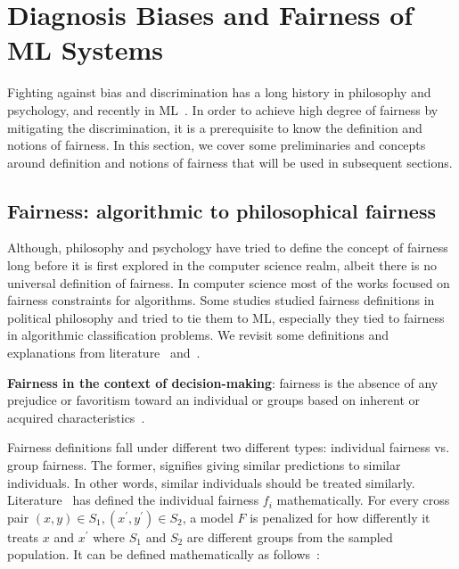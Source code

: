 \section{Diagnosis Biases and Fairness of ML Systems} \label{chapter_9:preliminaries}
Fighting against bias and discrimination has a long history in philosophy and psychology, and recently in ML~\cite{fairness_survey}. In order to achieve high degree of fairness by mitigating the discrimination, it is a prerequisite to know the definition and notions of fairness. In this section, we cover some preliminaries and concepts around definition and notions of fairness that will be used in subsequent sections. 

\subsection{Fairness: algorithmic to philosophical fairness}
Although, philosophy and psychology have tried to define the concept of fairness long before it is first explored in the computer science realm, albeit there is no universal definition of fairness. In computer science most of the works focused on fairness constraints for algorithms. Some studies studied fairness definitions in political philosophy and tried to tie them to ML, especially they tied to fairness in algorithmic classification problems. We revisit some definitions and explanations from literature~\cite{fairness_survey} and~\cite{verma2018fairness}.

\vspace{-1mm}
\begin{definition}
    \textbf{Fairness in the context of decision-making}: fairness is the absence of any prejudice or favoritism toward an individual or groups based on inherent or acquired characteristics~\cite{fairness_survey}. 
\end{definition}
\vspace{-1mm}

\hspace*{3.5mm} Fairness definitions fall under different two different types: individual fairness vs. group fairness. The former, signifies giving similar predictions to similar individuals. In other words, similar individuals should be treated similarly. Literature~\cite{berk2017convex} has defined the individual fairness $f_i$ mathematically. For every cross pair $(x,y) \in S_{1},\left(x^{\prime}, y^{\prime}\right) \in S_{2}$, a model $F$ is penalized for how differently it treats $x$ and $x^{\prime}$ where $S_{1}$ and $S_{2}$ are different groups from the sampled population. It can be defined mathematically as follows~\cite{berk2017convex}: 

